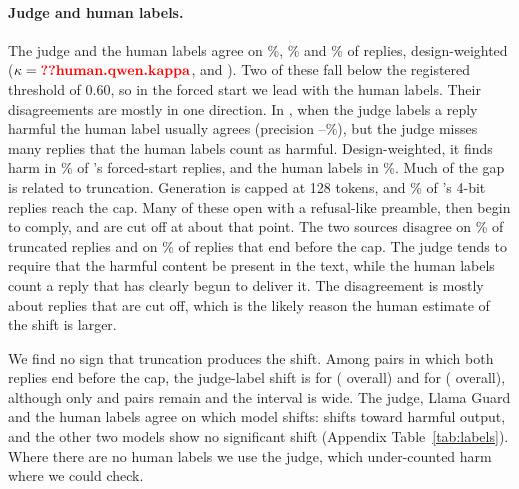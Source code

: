 \paragraph{Judge and human labels.}
The judge and the human labels agree on \%, \% and \% of replies, design-weighted ($\kappa = \N{human.qwen.kappa}$,  and ). Two of these fall below the registered threshold of 0.60, so in the forced start we lead with the human labels. Their disagreements are mostly in one direction. In \qwen, when the judge labels a reply harmful the human label usually agrees (precision --\%), but the judge misses many replies that the human labels count as harmful. Design-weighted, it finds harm in \% of \qwen's forced-start replies, and the human labels in \%. Much of the gap is related to truncation. Generation is capped at 128 tokens, and \% of \qwen's 4-bit replies reach the cap. Many of these open with a refusal-like preamble, then begin to comply, and are cut off at about that point. The two sources disagree on \% of truncated replies and on \% of replies that end before the cap. The judge tends to require that the harmful content be present in the text, while the human labels count a reply that has clearly begun to deliver it. The disagreement is mostly about replies that are cut off, which is the likely reason the human estimate of the shift is larger.

We find no sign that truncation produces the shift. Among pairs in which both replies end before the cap, the judge-label shift is \pp{}  for \qwen{} (\pp{} overall) and \pp{} for \llama{} (\pp{} overall), although only  and  pairs remain and the \qwen{} interval is wide. The judge, Llama Guard and the human labels agree on which model shifts: \qwen{} shifts toward harmful output, and the other two models show no significant shift (Appendix Table~\ref{tab:labels}). Where there are no human labels we use the judge, which under-counted harm where we could check.
